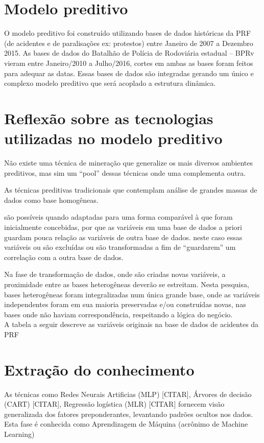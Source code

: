 \section{Modelo preditivo}

O modelo preditivo foi construído utilizando bases de dados históricas da PRF (de acidentes e de paralisações ex: protestos) entre Janeiro de 2007 a 
Dezembro 2015. As bases de dados do Batalhão de Polícia de Rodoviária estadual -- BPRv vieram entre Janeiro/2010 a Julho/2016, cortes em ambas as bases foram 
feitos para adequar as datas. Essas bases de dados são integradas gerando um único e complexo modelo preditivo que será acoplado a estrutura dinâmica.



\section{Reflexão sobre as tecnologias utilizadas no modelo preditivo}\label{result}

Não existe uma técnica de mineração que generalize os mais diversos ambientes preditivos, mas sim um ``pool'' dessas técnicas onde uma complementa outra.

As técnicas preditivas tradicionais que contemplam análise de grandes massas de dados como base homogêneas.

são possíveis quando adaptadas para uma forma comparável à que
foram inicialmente concebidas, por que as variáveis em uma base de dados a priori guardam pouca relação as variáveis de outra base de dados.
neste caso essas variáveis ou são excluídas ou são transformadas a fim de ``guardarem'' um correlação com a outra base de dados. 

Na fase de transformação de dados, onde são criadas novas variáveis, a proximidade entre as
bases heterogêneas deverão se estreitam. 
Nesta pesquisa, bases heterogêneas foram integralizadas num única grande base, onde as variáveis independentes foram
em sua maioria preservadas e/ou construídas novas, nas bases onde não haviam correspondência, respeitando a lógica do negócio.\\
A tabela a seguir descreve as variáveis originais na base de dados de acidentes da PRF 


\section{Extração do conhecimento}

As técnicas como Redes Neurais Artificias (MLP) [\large{CITAR}], Árvores de decisão (CART) [\large{CITAR}], Regressão logística (MLR) 
[\large{CITAR}] fornecem visão generalizada dos fatores preponderantes, levantando padrões ocultos nos dados. Esta fase é conhecida como 
Aprendizagem de Máquina (acrônimo de Machine Learning)

